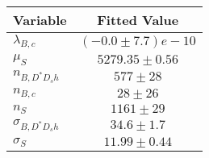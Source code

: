 \begin{tabular}[t]{lc}
\hline
Variable &Fitted Value\\
\hline\hline
$\lambda_{B,c}$&$(-0.0\pm7.7)e-10$\\
\hline
$\mu_S$&$5279.35\pm0.56$\\
\hline
$n_{B, D^* D_s h}$&$577\pm28$\\
\hline
$n_{B,c}$&$28\pm26$\\
\hline
$n_S$&$1161\pm29$\\
\hline
$\sigma_{B, D^* D_s h}$&$34.6\pm1.7$\\
\hline
$\sigma_S$&$11.99\pm0.44$\\
\hline
\end{tabular}